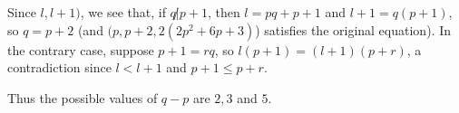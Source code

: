 \documentclass[a4paper, 12pt]{article}
\begin{document}
\begin{enumerate}
    Since $l, l+ 1)$, we see that, if $q \not | p + 1$, then $l = pq + p + 1$ and $l + 1 = q(p + 1)$, so $q = p + 2$ (and $(p, p + 2, 2(2p^2 + 6p + 3)$) satisfies the original equation). In the contrary case, suppose $p + 1 = rq$, so $l(p + 1) = (l + 1)(p + r)$, a contradiction since $l < l + 1$ and $p + 1 \leq p + r$.
    
    Thus the possible values of $q - p$ are $2, 3$ and $5$.

\end{enumerate}
\end{document}
